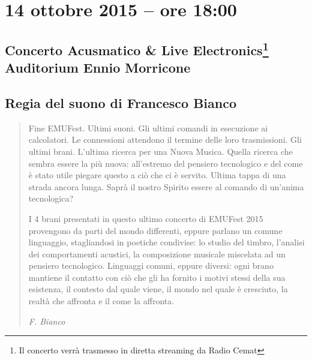 \documentclass[8pt, twoside, a5paper]{extreport}
\begin{document}
\vspace{3mm}

\begin{multicols}{2}




\end{multicols}

\clearpage

\section*{14 ottobre 2015 -- ore 18:00}

\subsection*{{\small Concerto Acusmatico \& Live Electronics\footnote{ Il concerto verrà trasmesso in diretta streaming da Radio Cemat}} \\
	\textsf{Auditorium Ennio Morricone}}

{\fontsize{30}{30} }

\subsection*{\textsf{Regia del suono di Francesco Bianco}}

\begin{quote}
{\svolk \small
Fine EMUFest. Ultimi suoni. Gli ultimi comandi in esecuzione ai calcolatori. Le connessioni attendono il termine delle loro trasmissioni. Gli ultimi brani. L'ultima ricerca per una Nuova Musica. Quella ricerca che sembra essere la più nuova: all'estremo del pensiero tecnologico e del come è stato utile piegare questo a ciò che ci è servito. Ultima tappa di una strada ancora lunga. Saprà il nostro Spirito essere al comando di un'anima tecnologica?

I 4 brani presentati in questo ultimo concerto di EMUFest 2015 provengono da parti del mondo differenti, eppure parlano un comune linguaggio, stagliandosi in poetiche condivise: lo studio del timbro, l'analisi dei comportamenti acustici, la composizione musicale miscelata ad un pensiero tecnologico. Linguaggi comuni, eppure diversi: ogni brano mantiene il contatto con ciò che gli ha fornito i motivi stessi della sua esistenza, il contesto dal quale viene, il mondo nel quale è cresciuto, la realtà che affronta e il come la affronta.
}

\emph{F. Bianco}
\end{quote}    
\end{document}
